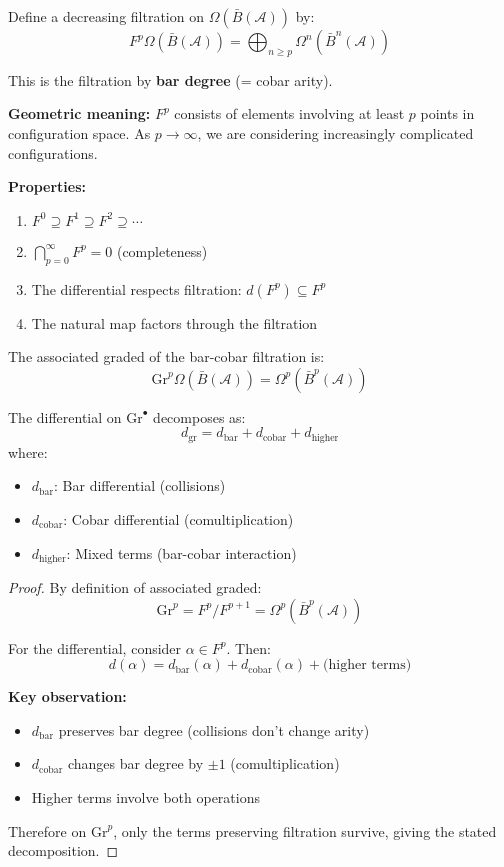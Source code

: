 \begin{definition}\label{def:bar-cobar-filtration}
Define a decreasing filtration on $\Omega(\bar{B}(\mathcal{A}))$ by:
$$F^p\Omega(\bar{B}(\mathcal{A})) = \bigoplus_{n \geq p} \Omega^n(\bar{B}^n(\mathcal{A}))$$

This is the filtration by \textbf{bar degree} (= cobar arity).

\textbf{Geometric meaning:} $F^p$ consists of elements involving at least $p$ points 
in configuration space. As $p \to \infty$, we are considering increasingly complicated 
configurations.

\textbf{Properties:}
\begin{enumerate}
\item $F^0 \supseteq F^1 \supseteq F^2 \supseteq \cdots$
\item $\bigcap_{p=0}^\infty F^p = 0$ (completeness)
\item The differential respects filtration: $d(F^p) \subseteq F^p$
\item The natural map factors through the filtration
\end{enumerate}
\end{definition}

\begin{lemma}\label{lem:bar-cobar-associated-graded}
The associated graded of the bar-cobar filtration is:
$$\text{Gr}^p\Omega(\bar{B}(\mathcal{A})) = \Omega^p(\bar{B}^p(\mathcal{A}))$$

The differential on $\text{Gr}^\bullet$ decomposes as:
$$d_{\text{gr}} = d_{\text{bar}} + d_{\text{cobar}} + d_{\text{higher}}$$
where:
\begin{itemize}
\item $d_{\text{bar}}$: Bar differential (collisions)
\item $d_{\text{cobar}}$: Cobar differential (comultiplication)
\item $d_{\text{higher}}$: Mixed terms (bar-cobar interaction)
\end{itemize}
\end{lemma}

\begin{proof}
By definition of associated graded:
$$\text{Gr}^p = F^p / F^{p+1} = \Omega^p(\bar{B}^p(\mathcal{A}))$$

For the differential, consider $\alpha \in F^p$. Then:
$$d(\alpha) = d_{\text{bar}}(\alpha) + d_{\text{cobar}}(\alpha) + \text{(higher terms)}$$

\textbf{Key observation:} 
\begin{itemize}
\item $d_{\text{bar}}$ preserves bar degree (collisions don't change arity)
\item $d_{\text{cobar}}$ changes bar degree by $\pm 1$ (comultiplication)
\item Higher terms involve both operations
\end{itemize}

Therefore on $\text{Gr}^p$, only the terms preserving filtration survive, giving 
the stated decomposition.
\end{proof}

